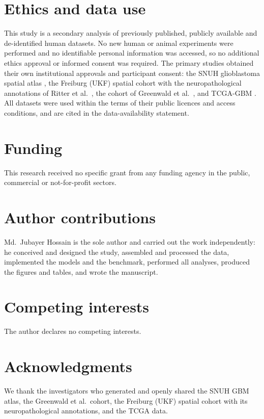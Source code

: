 \documentclass[11pt,letterpaper]{article}
\begin{document}
\section*{Ethics and data use}
This study is a secondary analysis of previously published, publicly available and de-identified
human datasets. No new human or animal experiments were performed and no identifiable personal
information was accessed, so no additional ethics approval or informed consent was required.
The primary studies obtained their own institutional approvals and participant consent: the SNUH
glioblastoma spatial atlas \cite{park2026}, the Freiburg (UKF) spatial cohort \cite{ravi2022} with
the neuropathological annotations of Ritter et al.\ \cite{ritter2025}, the cohort of Greenwald
et al.\ \cite{greenwald2024}, and TCGA-GBM \cite{tcga2008}. All datasets were used within the terms
of their public licences and access conditions, and are cited in the data-availability statement.

\section*{Funding}
This research received no specific grant from any funding agency in the public, commercial or
not-for-profit sectors.

\section*{Author contributions}
Md.\ Jubayer Hossain is the sole author and carried out the work independently: he conceived and
designed the study, assembled and processed the data, implemented the models and the benchmark,
performed all analyses, produced the figures and tables, and wrote the manuscript.

\section*{Competing interests}
The author declares no competing interests.

\section*{Acknowledgments}
We thank the investigators who generated and openly shared the SNUH GBM atlas, the Greenwald et al.\ cohort, the Freiburg (UKF) spatial cohort with its neuropathological annotations, and the TCGA data.



\clearpage
\appendix
\end{document}
